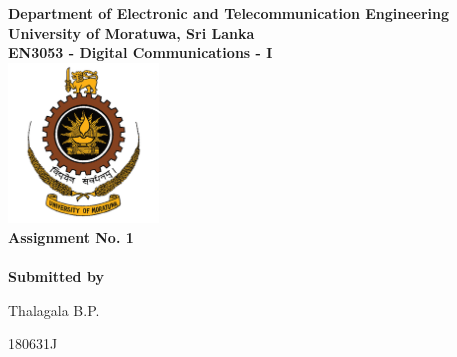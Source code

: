 \begin{titlepage}
\center %

\textbf{\large Department of Electronic and Telecommunication Engineering}\\[0.5cm]
\textbf{\Large University of Moratuwa, Sri Lanka}\\[1cm]
\textbf{\large EN3053 - Digital Communications - I}\\[2cm]
\includegraphics[width=0.3\textwidth]{figures/uomlogo}\\[2cm]

	
\textbf{\Huge Assignment No. 1}\\[0.5cm]
\textbf{\Large }\\[5cm]



\textbf{\large Submitted by}\\[0.5cm]
\begin{minipage}{0.2\textwidth}
	\begin{flushleft}
		{\large Thalagala B.P.}\\[4mm]

		
		
	\end{flushleft}
\end{minipage}
\hspace{5mm}
\begin{minipage}{0.2\textwidth}
	\begin{flushright}
		{\large 180631J }\\[4mm]


\end{flushright}
\end{minipage}
\end{titlepage}
